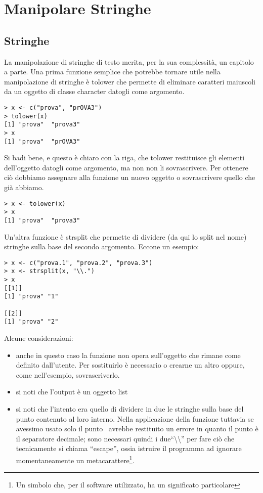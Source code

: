 \chapter{Manipolare Stringhe}
\section{Stringhe}
La manipolazione di stringhe di testo merita, per la sua complessità, un capitolo a parte.
Una prima funzione semplice che potrebbe tornare utile nella manipolazione di stringhe è \textsf{tolower} che permette di eliminare caratteri maiuscoli da un   oggetto di classe character datogli come argomento. 
\begin{lstlisting}
> x <- c("prova", "prOVA3")
> tolower(x)
[1] "prova"  "prova3"
> x
[1] "prova"  "prOVA3"
\end{lstlisting}
Si badi bene, e questo è chiaro con la riga, che \textsf{tolower} restituisce gli elementi dell'oggetto datogli come argomento, ma non non li sovrascrivere. Per ottenere ciò dobbiamo assegnare alla funzione un nuovo oggetto o sovrascrivere quello che già abbiamo.
\begin{lstlisting}
> x <- tolower(x)
> x
[1] "prova"  "prova3"
\end{lstlisting}

Un'altra funzione è \textsf{strsplit} che permette di dividere (da qui lo split nel nome) stringhe sulla base del secondo argomento. Eccone un esempio:
\begin{lstlisting}
> x <- c("prova.1", "prova.2", "prova.3")
> x <- strsplit(x, "\\.")
> x
[[1]]
[1] "prova" "1"    

[[2]]
[1] "prova" "2"  
\end{lstlisting}
Alcune considerazioni:
\begin{itemize}
\item anche in questo caso la funzione non opera sull'oggetto che rimane come definito dall'utente. Per sostituirlo è necessario o crearne un altro oppure, come nell'esempio, sovrascriverlo.
\item si noti che l'output è un oggetto list
\item si noti che l'intento era quello di dividere in due le stringhe sulla base del punto contenuto al loro interno. Nella applicazione della funzione tuttavia se avessimo usato solo il punto \erre\ avrebbe restituito un errore in quanto il punto è il separatore decimale; sono necessari quindi i due``\textbackslash\textbackslash'' per fare ciò che tecnicamente si chiama ``escape'', ossia istruire il programma ad ignorare momentaneamente un metacarattere\footnote{Un simbolo che, per il software utilizzato, ha un significato particolare}.
\end{itemize}


